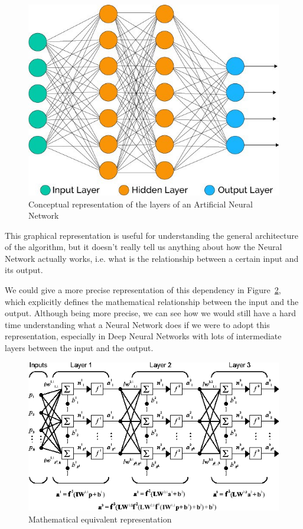 \documentclass[conference]{IEEEtran}
\begin{document}
\begin{figure}[ht!] \centering \includegraphics[width=0.8 \linewidth]{images/nn}
    \caption{Conceptual representation of the layers of an Artificial Neural Network}
    \label{fig:nn} \end{figure}

This graphical representation is useful for understanding the general
architecture of the algorithm, but it doesn't really tell us anything about
how the Neural Network actually works, i.e. what is the relationship between a
certain input and its output.

We could give a more precise representation of this dependency in
Figure~\ref{fig:mathnn}, which explicitly defines the mathematical relationship
between the input and the output. Although being more precise, we can see how we would still have a hard time
understanding what a Neural Network does if we were to adopt this
representation, especially in Deep Neural Networks with lots of intermediate layers between the input and the output.

\begin{figure}[ht!] \centering
    \includegraphics[width=0.9\linewidth]{images/nmodel} \caption{Mathematical
        equivalent representation} \label{fig:mathnn} \end{figure}
\end{document}
